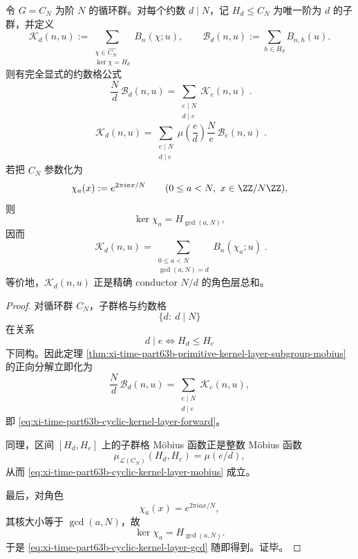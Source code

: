 \begin{corollary}\label{cor:xi-time-part63b-cyclic-kernel-layer-divisor-mobius}
令 \(G=C_N\) 为阶 \(N\) 的循环群。对每个约数 \(d\mid N\)，记 \(H_d\le C_N\) 为唯一阶为 \(d\) 的子群，并定义
\[
\mathcal K_d(n,u)
:=
\sum_{\substack{\chi\in \widehat{C_N}\\ \ker\chi=H_d}} B_n(\chi;u),
\qquad
\mathcal B_d(n,u)
:=
\sum_{h\in H_d}B_{n,h}(u).
\]
则有完全显式的约数格公式
\begin{equation}\label{eq:xi-time-part63b-cyclic-kernel-layer-forward}
\boxed{\;
\frac{N}{d}\,\mathcal B_d(n,u)
=
\sum_{\substack{e\mid N\\ d\mid e}}\mathcal K_e(n,u)\; }.
\end{equation}
\begin{equation}\label{eq:xi-time-part63b-cyclic-kernel-layer-mobius}
\boxed{\;
\mathcal K_d(n,u)
=
\sum_{\substack{e\mid N\\ d\mid e}}
\mu\!\left(\frac{e}{d}\right)\frac{N}{e}\,\mathcal B_e(n,u)\; }.
\end{equation}
若把 \(\widehat{C_N}\) 参数化为
\[
\chi_a(x):=e^{2\pi i ax/N}
\qquad (0\le a<N,\ x\in \ZZ/N\ZZ),
\]
则
\[
\ker\chi_a=H_{\gcd(a,N)},
\]
因而
\begin{equation}\label{eq:xi-time-part63b-cyclic-kernel-layer-gcd}
\boxed{\;
\mathcal K_d(n,u)
=
\sum_{\substack{0\le a<N\\ \gcd(a,N)=d}} B_n(\chi_a;u)\; }.
\end{equation}
等价地，\(\mathcal K_d(n,u)\) 正是精确 conductor \(N/d\) 的角色层总和。
\end{corollary}
\begin{proof}
对循环群 \(C_N\)，子群格与约数格
\[
\{d:\ d\mid N\}
\]
在关系
\[
d\mid e \iff H_d\le H_e
\]
下同构。因此定理 \ref{thm:xi-time-part63b-primitive-kernel-layer-subgroup-mobius} 的正向分解立即化为
\[
\frac{N}{d}\,\mathcal B_d(n,u)
=
\sum_{\substack{e\mid N\\ d\mid e}}\mathcal K_e(n,u),
\]
即
\eqref{eq:xi-time-part63b-cyclic-kernel-layer-forward}。

同理，区间 \([H_d,H_e]\) 上的子群格 Möbius 函数正是整数 Möbius 函数
\[
\mu_{\mathcal L(C_N)}(H_d,H_e)=\mu(e/d),
\]
从而
\eqref{eq:xi-time-part63b-cyclic-kernel-layer-mobius} 成立。

最后，对角色
\[
\chi_a(x)=e^{2\pi i ax/N},
\]
其核大小等于 \(\gcd(a,N)\)，故
\[
\ker\chi_a=H_{\gcd(a,N)}.
\]
于是
\eqref{eq:xi-time-part63b-cyclic-kernel-layer-gcd} 随即得到。证毕。
\end{proof}

